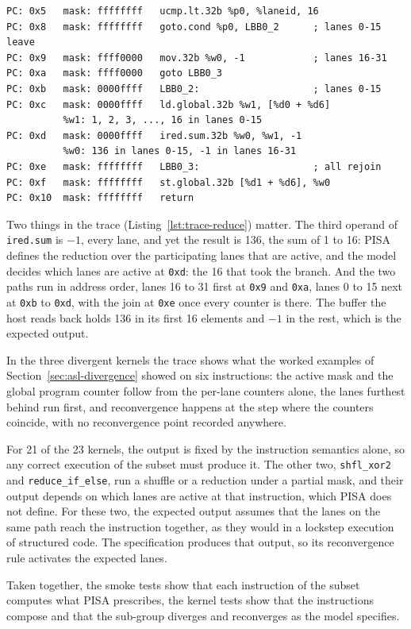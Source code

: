 \begin{lstlisting}[caption={[Trace of reduce\_if\_else]Trace of
\texttt{reduce\_if\_else}, abridged: the branch, the two paths, and
the join.}, label={lst:trace-reduce}]
PC: 0x5   mask: ffffffff   ucmp.lt.32b %p0, %laneid, 16
PC: 0x8   mask: ffffffff   goto.cond %p0, LBB0_2      ; lanes 0-15 leave
PC: 0x9   mask: ffff0000   mov.32b %w0, -1            ; lanes 16-31
PC: 0xa   mask: ffff0000   goto LBB0_3
PC: 0xb   mask: 0000ffff   LBB0_2:                    ; lanes 0-15
PC: 0xc   mask: 0000ffff   ld.global.32b %w1, [%d0 + %d6]
          %w1: 1, 2, 3, ..., 16 in lanes 0-15
PC: 0xd   mask: 0000ffff   ired.sum.32b %w0, %w1, -1
          %w0: 136 in lanes 0-15, -1 in lanes 16-31
PC: 0xe   mask: ffffffff   LBB0_3:                    ; all rejoin
PC: 0xf   mask: ffffffff   st.global.32b [%d1 + %d6], %w0
PC: 0x10  mask: ffffffff   return
\end{lstlisting}

Two things in the trace (Listing~\ref{lst:trace-reduce}) matter. The
third operand of \texttt{ired.sum} is $-1$, every lane, and yet the
result is 136, the sum of 1 to 16: PISA defines the reduction over the
participating lanes that are active, and the model decides which lanes
are active at \texttt{0xd}: the 16 that took the branch. And the two paths
run in address order, lanes 16 to 31 first at \texttt{0x9} and
\texttt{0xa}, lanes 0 to 15 next at \texttt{0xb} to \texttt{0xd}, with
the join at \texttt{0xe} once every counter is there. The buffer the
host reads back holds 136 in its first 16 elements and $-1$ in
the rest, which is the expected output.

In the three divergent kernels the trace shows what the worked examples
of Section~\ref{sec:asl-divergence} showed on six instructions: the
active mask and the global program counter follow from the per-lane
counters alone, the lanes furthest behind run first, and reconvergence
happens at the step where the counters coincide, with no reconvergence
point recorded anywhere.

For 21 of the 23 kernels, the output is fixed by the instruction
semantics alone, so any correct execution of the subset must produce
it. The other two, \texttt{shfl\_xor2} and \texttt{reduce\_if\_else},
run a shuffle or a reduction under a partial mask, and their output
depends on which lanes are active at that instruction, which PISA does
not define. For these two, the expected output assumes that the lanes on the same
path reach the instruction together, as they would in a lockstep
execution of structured code. The specification produces that output,
so its reconvergence rule
activates the expected lanes.

Taken together, the smoke tests show that each instruction of the
subset computes what PISA prescribes, the kernel tests show that the
instructions compose and that the sub-group diverges and reconverges as
the model specifies.
